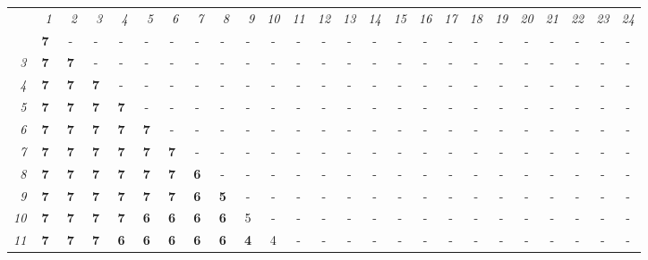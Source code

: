 \documentclass[12pt,landscape]{article}
\begin{document}
\begin{center}

\begin{tabular}{c|c|c|c|c|c|c|c|c|c|c|c|c|c|c|c|c|c|c|c|c|c|c|c|c|}
\cline{2-25}
  & {\it ~1} & {\it ~2} & {\it ~3} & {\it ~4} & {\it ~5} & {\it ~6} & {\it ~7} & {\it ~8} & {\it ~9} & {\it 10} & {\it 11} & {\it 12} & {\it 13} & {\it 14} & {\it 15} & {\it 16} & {\it 17} & {\it 18} & {\it 19} & {\it 20} & {\it 21} & {\it 22} & {\it 23} & {\it 24} \\ \hhline{-|=|=|=|=|=|=|=|=|=|=|=|=|=|=|=|=|=|=|=|=|=|=|=|=|}
\multicolumn{1}{|r||}{\it 2} & {\bf 7} & - & - & - & - & - & - & - & - & - & - & - & - & - & - & - & - & - & - & - & - & - & - & - \\ \hline
\multicolumn{1}{|r||}{\it 3} & {\bf 7} & {\bf 7} & - & - & - & - & - & - & - & - & - & - & - & - & - & - & - & - & - & - & - & - & - & - \\ \hline
\multicolumn{1}{|r||}{\it 4} & {\bf 7} & {\bf 7} & {\bf 7} & - & - & - & - & - & - & - & - & - & - & - & - & - & - & - & - & - & - & - & - & - \\ \hline
\multicolumn{1}{|r||}{\it 5} & {\bf 7} & {\bf 7} & {\bf 7} & {\bf 7} & - & - & - & - & - & - & - & - & - & - & - & - & - & - & - & - & - & - & - & - \\ \hline
\multicolumn{1}{|r||}{\it 6} & {\bf 7} & {\bf 7} & {\bf 7} & {\bf 7} & {\bf 7} & - & - & - & - & - & - & - & - & - & - & - & - & - & - & - & - & - & - & - \\ \hline
\multicolumn{1}{|r||}{\it 7} & {\bf 7} & {\bf 7} & {\bf 7} & {\bf 7} & {\bf 7} & {\bf 7} & - & - & - & - & - & - & - & - & - & - & - & - & - & - & - & - & - & - \\ \hline
\multicolumn{1}{|r||}{\it 8} & {\bf 7} & {\bf 7} & {\bf 7} & {\bf 7} & {\bf 7} & {\bf 7} & {\bf 6} & - & - & - & - & - & - & - & - & - & - & - & - & - & - & - & - & - \\ \hline
\multicolumn{1}{|r||}{\it 9} & {\bf 7} & {\bf 7} & {\bf 7} & {\bf 7} & {\bf 7} & {\bf 7} & {\bf 6} & {\bf 5} & - & - & - & - & - & - & - & - & - & - & - & - & - & - & - & - \\ \hline
\multicolumn{1}{|r||}{\it 10} & {\bf 7} & {\bf 7} & {\bf 7} & {\bf 7} & {\bf 6} & {\bf 6} & {\bf 6} & {\bf 6} & 5 & - & - & - & - & - & - & - & - & - & - & - & - & - & - & - \\ \hline
\multicolumn{1}{|r||}{\it 11} & {\bf 7} & {\bf 7} & {\bf 7} & {\bf 6} & {\bf 6} & {\bf 6} & {\bf 6} & {\bf 6} & {\bf 4} & 4 & - & - & - & - & - & - & - & - & - & - & - & - & - & - \\ \hline

\end{tabular}
\end{center}
\end{document}
